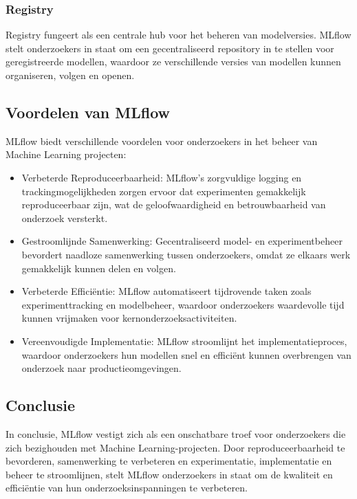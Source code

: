 \subsubsection{Registry}
Registry fungeert als een centrale hub voor het beheren van modelversies. MLflow stelt onderzoekers in staat om een gecentraliseerd repository in te stellen voor geregistreerde modellen, waardoor ze verschillende versies van modellen kunnen organiseren, volgen en openen.

\subsection{Voordelen van MLflow}

MLflow biedt verschillende voordelen voor onderzoekers in het beheer van Machine Learning projecten:

\begin{itemize}
    \item Verbeterde Reproduceerbaarheid: MLflow's zorgvuldige logging en trackingmogelijkheden zorgen ervoor dat experimenten gemakkelijk reproduceerbaar zijn, wat de geloofwaardigheid en betrouwbaarheid van onderzoek versterkt.
    \item Gestroomlijnde Samenwerking: Gecentraliseerd model- en experimentbeheer bevordert naadloze samenwerking tussen onderzoekers, omdat ze elkaars werk gemakkelijk kunnen delen en volgen.
    \item Verbeterde Efficiëntie: MLflow automatiseert tijdrovende taken zoals experimenttracking en modelbeheer, waardoor onderzoekers waardevolle tijd kunnen vrijmaken voor kernonderzoeksactiviteiten.
    \item Vereenvoudigde Implementatie: MLflow stroomlijnt het implementatieproces, waardoor onderzoekers hun modellen snel en efficiënt kunnen overbrengen van onderzoek naar productieomgevingen.
\end{itemize}

\subsection{Conclusie}

In conclusie, MLflow vestigt zich als een onschatbare troef voor onderzoekers die zich bezighouden met Machine Learning-projecten. Door reproduceerbaarheid te bevorderen, samenwerking te verbeteren en experimentatie, implementatie en beheer te stroomlijnen, stelt MLflow onderzoekers in staat om de kwaliteit en efficiëntie van hun onderzoeksinspanningen te verbeteren.

